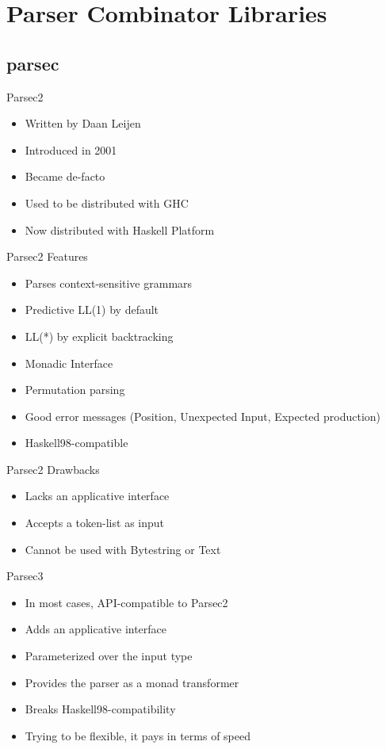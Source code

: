 \documentclass{beamer}
\begin{document}
\section{Parser Combinator Libraries}


\subsection{parsec}

\begin{frame}{Parsec2}
\begin{itemize}
\item Written by Daan Leijen
\item Introduced in 2001
\item Became de-facto
\item Used to be distributed with GHC
\item Now distributed with Haskell Platform
\end{itemize}
\end{frame}

\begin{frame}{Parsec2 Features}
\begin{itemize}
\item Parses context-sensitive grammars
\item Predictive LL(1) by default
\item LL(*) by explicit backtracking
\item Monadic Interface
\item Permutation parsing
\item Good error messages (Position, Unexpected Input, Expected production)
\item Haskell98-compatible
\end{itemize}
\end{frame}

\begin{frame}{Parsec2 Drawbacks}
\begin{itemize}
\item Lacks an applicative interface
\item Accepts a token-list as input
\item Cannot be used with Bytestring or Text
\end{itemize}
\end{frame}

\begin{frame}{Parsec3}
\begin{itemize}
\item In most cases, API-compatible to Parsec2
\item Adds an applicative interface
\item Parameterized over the input type
\item Provides the parser as a monad transformer
\item Breaks Haskell98-compatibility
\item Trying to be flexible, it pays in terms of speed
\end{itemize}
\end{frame}
\end{document}
